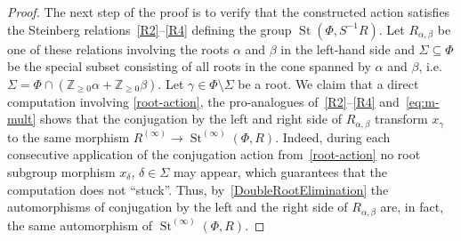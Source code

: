 \documentclass[oneside, 11pt]{amsart}
\numberwithin{equation}{section}
\theoremstyle{definition}
\theoremstyle{remark}
\DeclareMathOperator\St{St}
\newcommand{\ZZ}{\mathbb{Z}}
\begin{document}
\begin{proof}
 The next step of the proof is to verify that the constructed action satisfies the Steinberg relations~\eqref{R2}--\eqref{R4} defining the group $\St(\Phi, S^{-1}R)$.
 Let $R_{\alpha, \beta}$ be one of these relations involving the roots $\alpha$ and $\beta$ in the left-hand side and $\Sigma \subseteq \Phi$ be the special subset consisting of all roots in the cone spanned by $\alpha$ and $\beta$, i.e. $\Sigma = \Phi \cap (\ZZ_{\geq 0} \alpha + \ZZ_{\geq 0} \beta)$. Let $\gamma \in \Phi \setminus \Sigma$ be a root. We claim that a direct computation involving \cref{root-action}, the pro-analogues of~\eqref{R2}--\eqref{R4} and~\eqref{eq:m-mult} shows that the conjugation by the left and right side of $R_{\alpha, \beta}$ transform $x_\gamma$ to the same morphism $R^{(\infty)} \to \St^{(\infty)}(\Phi, R)$.
 Indeed, during each consecutive application of the conjugation action from~\cref{root-action} no root subgroup morphism $x_\delta$, $\delta \in \Sigma$ may appear, which guarantees that the computation does not ``stuck''. Thus, by~\cref{DoubleRootElimination} the automorphisms of conjugation by the left and the right side of $R_{\alpha,\beta}$ are, in fact, the same automorphism of $\St^{(\infty)}(\Phi, R)$.


\end{proof}
\end{document}
